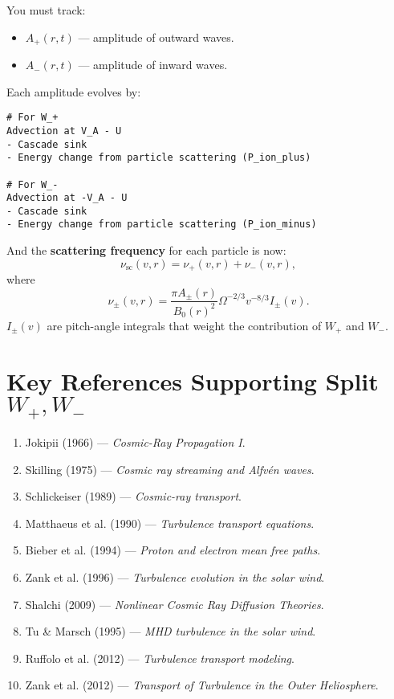 You must track:
\begin{itemize}
    \item $A_+(r, t)$ — amplitude of outward waves.
    \item $A_-(r, t)$ — amplitude of inward waves.
\end{itemize}

Each amplitude evolves by:

\begin{verbatim}
# For W_+
Advection at V_A - U
- Cascade sink
- Energy change from particle scattering (P_ion_plus)

# For W_-
Advection at -V_A - U
- Cascade sink
- Energy change from particle scattering (P_ion_minus)
\end{verbatim}

And the \textbf{scattering frequency} for each particle is now:
\[
\nu_{\text{sc}}(v, r) = \nu_+(v, r) + \nu_-(v, r),
\]
where
\[
\nu_\pm(v, r) = \frac{\pi A_\pm(r)}{B_0(r)^2} \Omega^{-2/3} v^{-8/3} I_\pm(v).
\]
$I_\pm(v)$ are pitch-angle integrals that weight the contribution of $W_+$ and $W_-$.

\hrulefill

\section*{\texorpdfstring{ \textbf{Key References Supporting Split $W_+, W_-$}}{}}

\begin{enumerate}
    \item Jokipii (1966) --- \textit{Cosmic-Ray Propagation I}.
    \item Skilling (1975) --- \textit{Cosmic ray streaming and Alfvén waves}.
    \item Schlickeiser (1989) --- \textit{Cosmic-ray transport}.
    \item Matthaeus et al. (1990) --- \textit{Turbulence transport equations}.
    \item Bieber et al. (1994) --- \textit{Proton and electron mean free paths}.
    \item Zank et al. (1996) --- \textit{Turbulence evolution in the solar wind}.
    \item Shalchi (2009) --- \textit{Nonlinear Cosmic Ray Diffusion Theories}.
    \item Tu \& Marsch (1995) --- \textit{MHD turbulence in the solar wind}.
    \item Ruffolo et al. (2012) --- \textit{Turbulence transport modeling}.
    \item Zank et al. (2012) --- \textit{Transport of Turbulence in the Outer Heliosphere}.
\end{enumerate}

